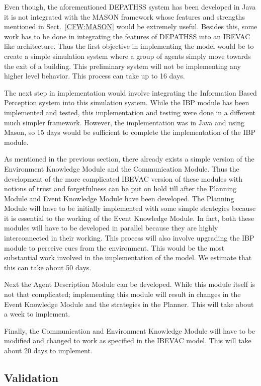 Even though, the aforementioned DEPATHSS system has been developed in Java it is not integrated with the MASON framework whose features and strengths mentioned in Sect.~\ref{CFW:MASON} would be extremely useful. Besides this, some work has to be done in integrating the features of DEPATHSS into an IBEVAC like architecture. Thus the first objective in implementing the model would be to create a simple simulation system where a group of agents simply move towards the exit of a building. This preliminary system will not be implementing any higher level behavior. This process can take up to 16 days.

The next step in implementation would involve integrating the Information Based Perception system into this simulation system. While the IBP module has been implemented and tested, this implementation and testing were done in a different much simpler framework. However, the implementation was in Java and using Mason, so 15 days would be sufficient to complete the implementation of the IBP module. 


As mentioned in the previous section, there already exists a simple version of the Environment Knowledge Module and the Communication Module. Thus the development of the more complicated IBEVAC version of these modules with notions of trust and forgetfulness can be put on hold till after the Planning Module and Event Knowledge Module have been developed. The Planning Module will have to be initially implemented with some simple strategies because it is essential to the working of the Event Knowledge Module. In fact, both these modules will have to be developed in parallel because they are highly interconnected in their working. This process will also involve upgrading the IBP module to perceive cues from the environment. This would be the most substantial work involved in the implementation of the model. We estimate that this can take about 50 days.

Next the Agent Description Module can be developed. While this module itself is not that complicated; implementing this module will result in changes in the Event Knowledge Module and the strategies in the Planner. This will take about a week to implement.

Finally, the Communication and Environment Knowledge Module will have to be modified and changed to work as specified in the IBEVAC model. This will take about 20 days to implement.

\subsection{Validation}
\label{CFW:Validation}

